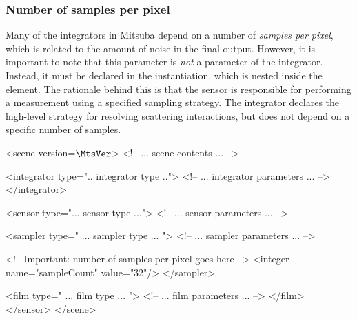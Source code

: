 \subsubsection*{Number of samples per pixel}
Many of the integrators in Mitsuba depend on a number of \emph{samples per pixel}, which is related
to the amount of noise in the final output. However, it is important to note that this parameter is
\emph{not} a parameter of the integrator.
Instead, it must be declared in the  instantiation, which is nested inside the
 element. The rationale behind this is that the sensor is responsible for performing
a measurement using a specified sampling strategy. The integrator declares the high-level strategy
for resolving scattering interactions, but does not depend on a specific number of samples.

\begin{xml}
<scene version=$\MtsVer$>
    <!-- ... scene contents ... -->

    <integrator type=".. integrator type ..">
        <!-- ... integrator parameters ... -->
    </integrator>

    <sensor type="... sensor type ...">
        <!-- ... sensor parameters ... -->

        <sampler type=" ... sampler type ... ">
            <!-- ... sampler parameters ... -->

            <!-- Important: number of samples per pixel goes here -->
            <integer name="sampleCount" value="32"/>
        </sampler>

        <film type=" ... film type ... ">
            <!-- ... film parameters ... -->
        </film>
    </sensor>
</scene>
\end{xml}
